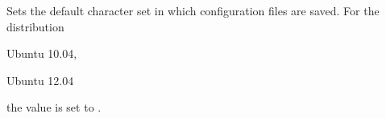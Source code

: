 
Sets the default character set  in which configuration files are 
saved. For the distribution
\begin{inparaitem}
\item[\TheDistribution{ubuntu}] Ubuntu 10.04,
\item[\TheDistribution{ubuntu}] Ubuntu 12.04
\end{inparaitem}
the value is set to .

